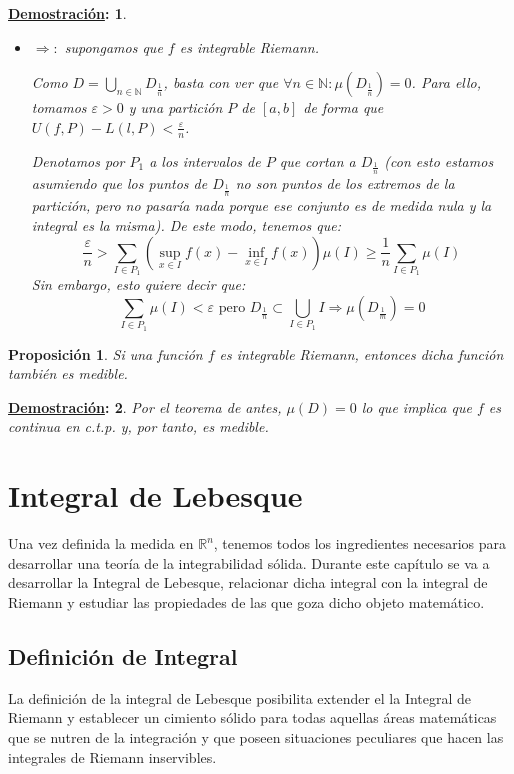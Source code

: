 \documentclass[10pt,a4paper,openright]{book}
\theoremstyle{break}
\newtheorem*{prop}{Proposición}
\newtheorem*{demo}{\underline{Demostración}:}
\begin{document}
\begin{demo}
\begin{itemize}
\item $\Rightarrow:$ supongamos que $f$ es integrable Riemann.

Como $D = \bigcup_{n \in \mathbb{N}} D_{\frac{1}{n}}$, basta con ver que $\forall n \in \mathbb{N}: \mu\left(D_{\frac{1}{n}}\right) = 0$. Para ello, tomamos $\varepsilon > 0$ y una partición $P$ de $\left[a, b\right]$ de forma que $U\left(f, P\right) - L\left(l, P\right) < \frac{\varepsilon}{n}$.

Denotamos por $P_1$ a los intervalos de $P$ que cortan a $D_{\frac{1}{n}}$ (con esto estamos asumiendo que los puntos de $D_{\frac{1}{n}}$ no son puntos de los extremos de la partición, pero no pasaría nada porque ese conjunto es de medida nula y la integral es la misma). De este modo, tenemos que:
$$\frac{\varepsilon}{n} > \sum_{I \in P_1} \left(\sup_{x \in I} f\left(x\right) - \inf_{x \in I} f\left(x\right) \right) \mu\left(I\right) \ge \frac{1}{n} \sum_{I \in P_1} \mu\left(I\right)$$
Sin embargo, esto quiere decir que:
$$\sum_{I \in P_1} \mu\left(I\right) < \varepsilon \mbox{ pero } D_{\frac{1}{n}} \subset \bigcup_{I \in P_1} I \Rightarrow \mu\left(D_{\frac{1}{m}}\right) = 0$$
\end{itemize}
\end{demo}

\begin{prop}
Si una función $f$ es integrable Riemann, entonces dicha función también es medible.
\end{prop}
\begin{demo}
Por el teorema de antes, $\mu(D) = 0$ lo que implica que $f$ es continua en c.t.p. y, por tanto, es medible.
\end{demo}

\chapter{Integral de Lebesque}
Una vez definida la medida en $\mathbb{R}^n$, tenemos todos los ingredientes necesarios para desarrollar una teoría de la integrabilidad sólida. Durante este capítulo se va a desarrollar la Integral de Lebesque, relacionar dicha integral con la integral de Riemann y estudiar las propiedades de las que goza dicho objeto matemático.

\section{Definición de Integral}
La definición de la integral de Lebesque posibilita extender el la Integral de Riemann y establecer un cimiento sólido para todas aquellas áreas matemáticas que se nutren de la integración y que poseen situaciones peculiares que hacen las integrales de Riemann inservibles.
\end{document}
